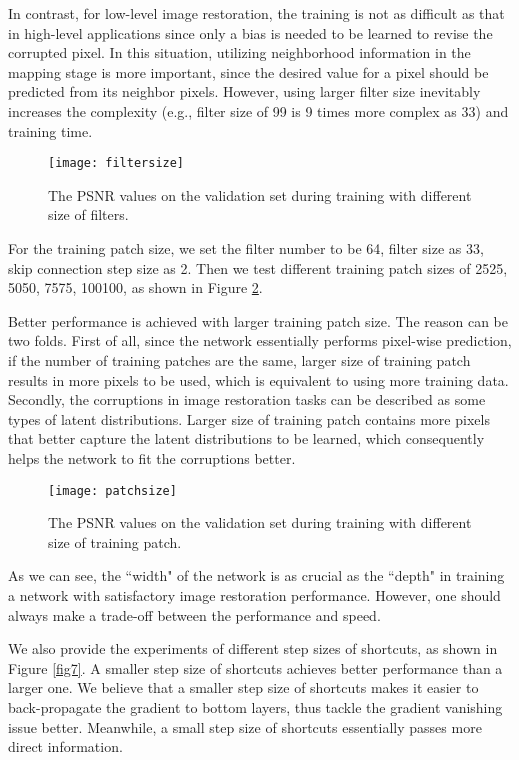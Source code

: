 \documentclass[10pt,journal,compsoc]{IEEEtran}
\begin{document}
In contrast, for low-level image restoration, the training is not as difficult as that in high-level
applications since only a bias is needed to be learned to revise the corrupted pixel.
In this situation, utilizing neighborhood information in the mapping stage is more important,
since the desired value for a pixel should be predicted from its neighbor pixels.
However, using larger filter size inevitably increases the complexity (e.g., filter
size of 99 is 9 times more complex as 33) and training time.

\begin{figure}[t!]
\centering
\texttt{[image: filtersize]}
\caption{The PSNR values on the validation set during training with different size of filters.}
\label{fig10}
\end{figure}

For the training patch size, we set the filter number to be 64, filter size as 33,
skip connection step size as 2. Then we test different training patch sizes of 2525,
5050, 7575, 100100, as shown in Figure \ref{fig11}.

Better
performance is achieved with larger training patch size. The reason can be two folds.
First of all, since the network essentially performs pixel-wise prediction, if the number
of training patches are the same, larger size of training patch results in more pixels
to be used, which is equivalent to using more training data. Secondly, the corruptions
in image restoration tasks can be described as some types of latent distributions. Larger
size of training patch contains more pixels that better capture the latent distributions
to be learned, which consequently helps the network to fit the corruptions better.

\begin{figure}[b!]
\centering
\texttt{[image: patchsize]}
\caption{The PSNR values on the validation set during training with different size of training patch.}
\label{fig11}
\end{figure}


As we can see, the ``width" of the network is as crucial as the ``depth" in training
a network with satisfactory image restoration performance. However, one should always make a
trade-off between the performance and speed.

We also provide the experiments of different step sizes of shortcuts, as shown in
Figure \ref{fig7}. A smaller step size of shortcuts achieves better performance than
a larger one. We believe that a smaller step size of shortcuts makes it easier
to back-propagate the gradient to bottom layers, thus tackle the gradient vanishing
issue better. Meanwhile, a small step size of shortcuts essentially passes more direct information.
\end{document}

